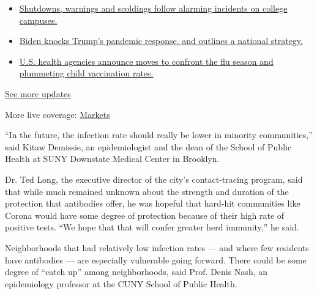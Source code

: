 \begin{itemize}
\tightlist
\item
  \href{https://www.nytimes3xbfgragh.onion/2020/08/20/world/coronavirus-covid.html?action=click\&pgtype=Article\&state=default\&region=MAIN_CONTENT_1\&context=storylines_live_updates\#link-68774d88}{Shutdowns,
  warnings and scoldings follow alarming incidents on college campuses.}
\item
  \href{https://www.nytimes3xbfgragh.onion/2020/08/20/world/coronavirus-covid.html?action=click\&pgtype=Article\&state=default\&region=MAIN_CONTENT_1\&context=storylines_live_updates\#link-26b58724}{Biden
  knocks Trump's pandemic response, and outlines a national strategy.}
\item
  \href{https://www.nytimes3xbfgragh.onion/2020/08/20/world/coronavirus-covid.html?action=click\&pgtype=Article\&state=default\&region=MAIN_CONTENT_1\&context=storylines_live_updates\#link-4e542da3}{U.S.
  health agencies announce moves to confront the flu season and
  plummeting child vaccination rates.}
\end{itemize}

\href{https://www.nytimes3xbfgragh.onion/2020/08/20/world/coronavirus-covid.html?action=click\&pgtype=Article\&state=default\&region=MAIN_CONTENT_1\&context=storylines_live_updates}{See
more updates}

More live coverage:
\href{https://www.nytimes3xbfgragh.onion/live/2020/08/20/business/stock-market-today-coronavirus?action=click\&pgtype=Article\&state=default\&region=MAIN_CONTENT_1\&context=storylines_live_updates}{Markets}

``In the future, the infection rate should really be lower in minority
communities,'' said Kitaw Demissie, an epidemiologist and the dean of
the School of Public Health at SUNY Downstate Medical Center in
Brooklyn.

Dr. Ted Long, the executive director of the city's contact-tracing
program, said that while much remained unknown about the strength and
duration of the protection that antibodies offer, he was hopeful that
hard-hit communities like Corona would have some degree of protection
because of their high rate of positive tests. ``We hope that that will
confer greater herd immunity,'' he said.

Neighborhoods that had relatively low infection rates --- and where few
residents have antibodies --- are especially vulnerable going forward.
There could be some degree of ``catch up'' among neighborhoods, said
Prof. Denis Nash, an epidemiology professor at the CUNY School of Public
Health.

